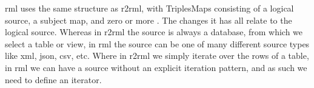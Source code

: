 \acrshort{rml} uses the same structure as \acrshort{r2rml}, with TriplesMaps consisting of a logical source, a subject map, and zero or more . The changes it has all relate to the logical source. Whereas in \acrshort{r2rml} the source is always a database, from which we select a table or view, in \acrshort{rml} the source can be one of many different source types like \acrshort{xml}, \acrshort{json}, \acrshort{csv}, etc. Where in \acrshort{r2rml} we simply iterate over the rows of a table, in \acrshort{rml} we can have a source without an explicit iteration pattern, and as such we need to define an iterator. 

